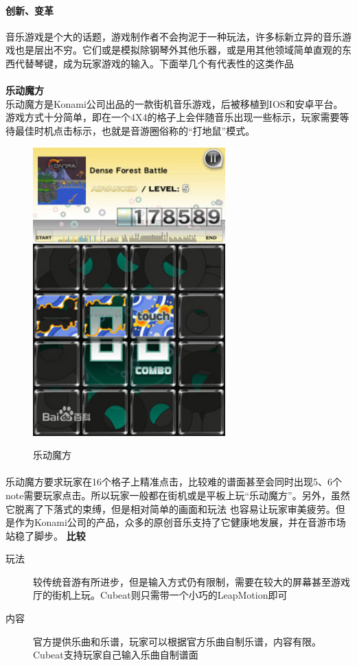 \documentclass{article}
\begin{document}
\paragraph{创新、变革}
音乐游戏是个大的话题，游戏制作者不会拘泥于一种玩法，许多标新立异的音乐游戏也是层出不穷。它们或是模拟除钢琴外其他乐器，或是用其他领域简单直观的东西代替琴键，成为玩家游戏的输入。下面举几个有代表性的这类作品
\paragraph{}
\textbf{乐动魔方}\\
乐动魔方是Konami公司出品的一款街机音乐游戏，后被移植到IOS和安卓平台。游戏方式十分简单，即在一个4X4的格子上会伴随音乐出现一些标示，玩家需要等待最佳时机点击标示，也就是音游圈俗称的“打地鼠”模式。
\begin{figure}[H]
  \centering
  \includegraphics[width=20em]{gm1.png}\\
  \caption{乐动魔方}\label{3-3}
\end{figure}
\paragraph{}
乐动魔方要求玩家在16个格子上精准点击，比较难的谱面甚至会同时出现5、6个note需要玩家点击。所以玩家一般都在街机或是平板上玩“乐动魔方”。另外，虽然它脱离了下落式的束缚，但是相对简单的画面和玩法
也容易让玩家审美疲劳。但是作为Konami公司的产品，众多的原创音乐支持了它健康地发展，并在音游市场站稳了脚步。
\textbf{比较}
\begin{description}
  \item[玩法] 较传统音游有所进步，但是输入方式仍有限制，需要在较大的屏幕甚至游戏厅的街机上玩。Cubeat则只需带一个小巧的LeapMotion即可
  \item[内容] 官方提供乐曲和乐谱，玩家可以根据官方乐曲自制乐谱，内容有限。Cubeat支持玩家自己输入乐曲自制谱面
\end{description}
\newpage
\end{document}
